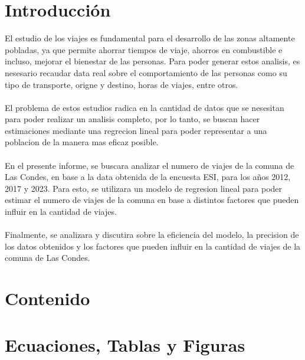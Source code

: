 \documentclass[12pt]{article} %
\begin{document}
\setcounter{page}{1} %

\section{Introducción}

El estudio de los viajes es fundamental para el desarrollo de las zonas altamente pobladas, ya que permite ahorrar tiempos de viaje, ahorros en combustible e incluso, mejorar el bienestar de las personas. Para poder generar estos analisis, es nesesario recaudar data real sobre el comportamiento de las personas como su tipo de transporte, origne y destino, horas de viajes, entre otros.
\\ \\
El problema de estos estudios radica en la cantidad de datos que se nesesitan para poder realizar un analisis completo, por lo tanto, se buscan hacer estimaciones mediante una regrecion lineal para poder representar a una poblacion de la manera mas eficaz posible.
\\ \\
En el presente informe, se buscara analizar el numero de viajes de la comuna de Las Condes, en base a la data obtenida de la encuesta ESI, para los años 2012, 2017 y 2023. Para esto, se utilizara un modelo de regresion lineal para poder estimar el numero de viajes de la comuna en base a distintos factores que pueden influir en la cantidad de viajes.
\\ \\
Finalmente, se analizara y discutira sobre la eficiencia del modelo, la precision de los datos obtenidos y los factores que pueden influir en la cantidad de viajes de la comuna de Las Condes.

\section{Contenido}

\section{Ecuaciones, Tablas y Figuras}
\end{document}
